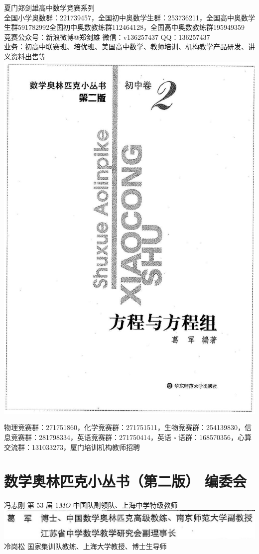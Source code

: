 \documentclass[10pt]{article}
\begin{document}
夏门郑剑雄高中数学竞赛系列\\
全国小学奥数群：221739457，全国初中奥数学生群：253736211，全国高中奥数学生群591782992全国初中奥数教练群112464128，全国高中奥数教练群195949359\\
竞赛公众号：新浪微博@郑剑雄 微信：v136257437 QQ：136257437\\
业务：初高中联赛班、培优班、美国高中数学、教师培训、机构教学产品研发、讲义资料出售等\\
\includegraphics[max width=\textwidth, center]{2024_10_30_26b590fd1106d28139f0g-001}

物理竞赛群：271751860，化学竞赛群：271751511，生物竞赛群：254139830，信息竞赛群：281798334，英语竞赛群：271750414，英语 $\square$ 语群：168570356，心算交流群：131033273，厦门培训机构教师招聘

\section*{数学奥林匹克小丛书（第二版） 编委会}
冯志刚 第 53 届 $1 M O$ 中国队副领队、上海中学特级教师\\
\includegraphics[max width=\textwidth, center]{2024_10_30_26b590fd1106d28139f0g-002}\\
冷岗松 国家集训队教练、上海大学教授、博士生导师
\end{document}

